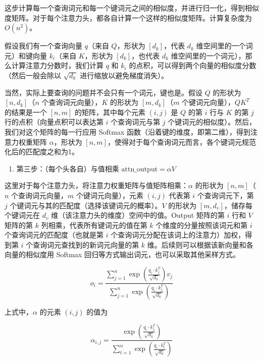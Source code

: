 这步计算每一个查询词元和每一个键词元之间的相似度，并进行归一化，得到相似度矩阵。对于每个注意力头，都各自计算一个这样的相似度矩阵。计算复杂度为 \(O(n^2)\)。

假设我们有一个查询向量 \(q\)（来自 \(Q\)，形状为 \([d_k]\)，代表 \(d_k\) 维空间里的一个词元）和键向量 \(k_i\)（来自 \(K\)，形状为 \([d_k]\)，也代表 \(d_k\) 维空间里的一个词元），那么计算注意力分数时，我们计算 \(q\) 和 \(k_i\) 的点积，可以得到两个向量的相似度分数（然后一般会除以 \(\sqrt{d_k}\) 进行缩放以避免梯度消失）。

当然，实际上要查询的问题并不会只有一个词元，键也是。假设 \(Q\) 的形状为 \([n,d_k]\)（\(n\) 个查询词元向量），\(K\) 的形状为 \([m,d_k]\)（\(m\) 个键词元向量），\(QK^T\) 的结果是一个 \([n,m]\) 的矩阵，其中每个元素 \((i,j)\) 是 \(Q\) 的第 \(i\) 行与 \(K\) 的第 \(j\) 行的点积（向量点积可以表达第 \(i\) 个查询词元与第 \(j\) 个键词元的相似度）。然后，我们对这个矩阵的每一行应用 Softmax 函数（沿着键的维度，即第二维），得到注意力权重矩阵 \(\alpha\)，形状为 \([n,m]\)，使得对于每个查询词元而言，各个键词元规范化后的匹配度之和为1。

\begin{enumerate}
\def\labelenumi{\arabic{enumi}.}
\setcounter{enumi}{2}
\tightlist
\item
  第三步：（每个头各自）与值相乘 \(\mathrm{attn\_output}=\alpha V\)
\end{enumerate}

这里对于每个注意力头，将注意力权重矩阵与值矩阵相乘：\(\alpha\) 的形状为 \([n,m]\)（\(n\) 个查询词元向量，\(m\) 个键词元向量），元素 \((i,j)\) 代表第 \(i\) 个查询词元下，第 \(j\) 个键词元与其的匹配度（选择该键词元的概率）。\(V\) 的形状为 \([m,d_v]\)，储存每个键词元在 \(d_v\) 维（该注意力头的维度）空间中的值。Output 矩阵的第 \(i\) 行和 \(V\) 矩阵的第 \(k\) 列相乘，代表所有键词元的值在第 \(k\) 个维度的分量按照该词元和第 \(i\) 个查询词元的匹配度（也就是第 \(i\) 个查询词元分配在该词上的注意力）加权，得到第 \(i\) 个查询词元查找到的新词元向量的第 \(k\) 维。后续则可以根据该新向量和各向量的相似度用 Softmax 回归等方式输出词元，也可以采取其他采样方式。

\[
o_i = \frac{\sum_{j=1}^{n} \exp\left(\frac{q_i \cdot k_j^T}{\sqrt{d_k}}\right) v_j}{\sum_{j=1}^{n} \exp\left(\frac{q_i \cdot k_j^T}{\sqrt{d_k}}\right)}
\]

上式中，\(\alpha\) 的元素 \((i,j)\) 的值为

\[
\alpha_{i,j} = \frac{\exp\left(\frac{q_i \cdot k_j^T}{\sqrt{d_k}}\right)}{\sum_{t=1}^{n} \exp\left(\frac{q_i \cdot k_t^T}{\sqrt{d_k}}\right)}
\]

